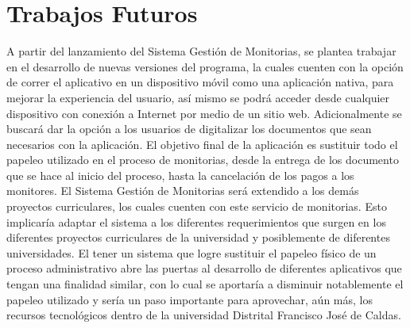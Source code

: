 \chapter{Trabajos Futuros}
A partir del lanzamiento del Sistema Gestión de Monitorias, se plantea trabajar en el desarrollo de nuevas versiones del programa, la cuales cuenten con la opción de correr el aplicativo en un dispositivo móvil como una aplicación nativa, para mejorar la experiencia del usuario, así mismo se podrá acceder desde cualquier dispositivo con conexión a Internet por medio de un sitio web. Adicionalmente se buscará dar la opción a los usuarios de digitalizar los documentos que sean necesarios con la aplicación. El objetivo final de la aplicación es sustituir todo el papeleo utilizado en el proceso de monitorias, desde la entrega de los documento que se hace al inicio del proceso, hasta la cancelación de los pagos a los monitores.
\newline
El Sistema Gestión de Monitorias será extendido a los demás proyectos curriculares, los cuales cuenten con este servicio de monitorias. Esto implicaría adaptar el sistema a los diferentes requerimientos que surgen en los diferentes proyectos curriculares de la universidad y posiblemente de diferentes universidades.  
\newline
El tener un sistema que logre sustituir el papeleo físico de un proceso administrativo abre las puertas al desarrollo de diferentes aplicativos que tengan una finalidad similar, con lo cual se aportaría a disminuir notablemente el papeleo utilizado y sería un paso importante para aprovechar, aún más, los recursos tecnológicos dentro de la universidad Distrital Francisco José de Caldas.